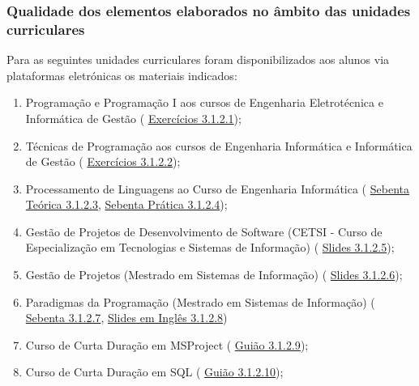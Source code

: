 \documentclass[11pt]{article}
\begin{document}
\subsubsection{Qualidade dos elementos elaborados no âmbito das unidades curriculares}Para as seguintes unidades curriculares foram disponibilizados aos alunos via plataformas eletrónicas os materiais indicados: 
\begin{enumerate}
\item{Programação e Programação I aos cursos de Engenharia Eletrotécnica e Informática de Gestão (
\href{run:Disciplinas/Apontamentos/ApontamentosAvaliacao/ProgI/exercicios.pdf}{Exercícios 3.1.2.1});}
\item{Técnicas de Programação aos cursos de Engenharia Informática e Informática de Gestão (
\href{run:Disciplinas/Apontamentos/ApontamentosAvaliacao/TP/exerciciosTP.pdf}{Exercícios 3.1.2.2});}
\item{Processamento de Linguagens ao Curso de Engenharia Informática (
\href{run:Disciplinas/Apontamentos/ApontamentosAvaliacao/ProcessamentoLinguagens/pling06TEO.pdf}{Sebenta Teórica 3.1.2.3}, 
\href{run:Disciplinas/Apontamentos/ApontamentosAvaliacao/ProcessamentoLinguagens/plingprof06.pdf}{Sebenta Prática 3.1.2.4});}
\item{Gestão de Projetos de Desenvolvimento de Software (CETSI - Curso de Especialização em Tecnologias e Sistemas de Informação) (
\href{run:Disciplinas/Apontamentos/ApontamentosAvaliacao/GPCETSI/acetatosGPSW.pdf}{Slides 3.1.2.5});}
\item{Gestão de Projetos (Mestrado em Sistemas de Informação) (
\href{run:Disciplinas/Apontamentos/acetatosGP.pdf}{Slides 3.1.2.6});}
\item{Paradigmas da Programação (Mestrado em Sistemas de Informação) (
\href{run:Disciplinas/Apontamentos/PPSebenta2015.pdf}{Sebenta 3.1.2.7}, 
\href{run:Disciplinas/Apontamentos/PPingles.pdf}{Slides em Inglês 3.1.2.8})}
\item{Curso de Curta Duração em MSProject (
\href{run:Disciplinas/Apontamentos/MSProject2010.pdf}{Guião 3.1.2.9});}
\item{Curso de Curta Duração em SQL (
\href{run:Disciplinas/Apontamentos/ApontamentosAvaliacao/CursoSQLZamora/SQLPlus.pdf}{Guião 3.1.2.10});}
\end{enumerate}
\end{document}
